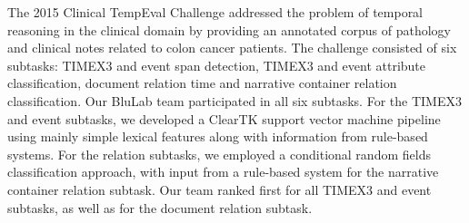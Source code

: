 The 2015 Clinical TempEval Challenge addressed the problem of temporal reasoning in the clinical domain by providing an annotated corpus of pathology and clinical notes related to colon cancer patients. The challenge consisted of six subtasks: TIMEX3 and event span detection, TIMEX3 and event attribute classification, document relation time and narrative container relation classification. Our BluLab team participated in all six subtasks. For the TIMEX3 and event subtasks, we developed a ClearTK support vector machine pipeline using mainly simple lexical features along with information from rule-based systems. For the relation subtasks, we employed a conditional random fields classification approach, with input from a rule-based system for the narrative container relation subtask. Our team ranked first for all TIMEX3 and event subtasks, as well as for the document relation subtask.

